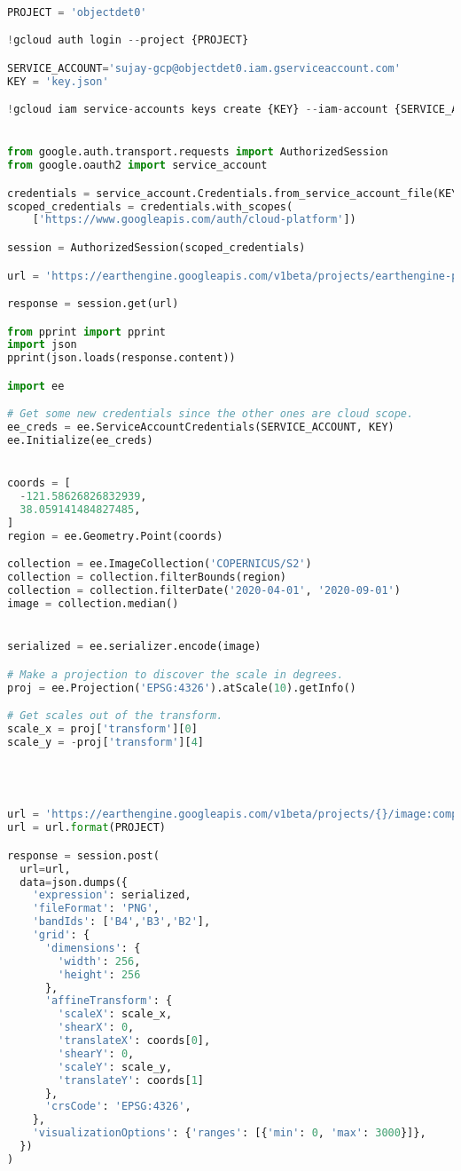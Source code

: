 \begin{lstlisting}[language=Python]

PROJECT = 'objectdet0'

!gcloud auth login --project {PROJECT}

SERVICE_ACCOUNT='sujay-gcp@objectdet0.iam.gserviceaccount.com'
KEY = 'key.json'

!gcloud iam service-accounts keys create {KEY} --iam-account {SERVICE_ACCOUNT}


from google.auth.transport.requests import AuthorizedSession
from google.oauth2 import service_account

credentials = service_account.Credentials.from_service_account_file(KEY)
scoped_credentials = credentials.with_scopes(
    ['https://www.googleapis.com/auth/cloud-platform'])

session = AuthorizedSession(scoped_credentials)

url = 'https://earthengine.googleapis.com/v1beta/projects/earthengine-public/assets/LANDSAT'

response = session.get(url)

from pprint import pprint
import json
pprint(json.loads(response.content))

import ee

# Get some new credentials since the other ones are cloud scope.
ee_creds = ee.ServiceAccountCredentials(SERVICE_ACCOUNT, KEY)
ee.Initialize(ee_creds)


coords = [
  -121.58626826832939, 
  38.059141484827485,
]
region = ee.Geometry.Point(coords)

collection = ee.ImageCollection('COPERNICUS/S2')
collection = collection.filterBounds(region)
collection = collection.filterDate('2020-04-01', '2020-09-01')
image = collection.median()


serialized = ee.serializer.encode(image)

# Make a projection to discover the scale in degrees.
proj = ee.Projection('EPSG:4326').atScale(10).getInfo()

# Get scales out of the transform.
scale_x = proj['transform'][0]
scale_y = -proj['transform'][4]




url = 'https://earthengine.googleapis.com/v1beta/projects/{}/image:computePixels'
url = url.format(PROJECT)

response = session.post(
  url=url,
  data=json.dumps({
    'expression': serialized,
    'fileFormat': 'PNG',
    'bandIds': ['B4','B3','B2'],
    'grid': {
      'dimensions': {
        'width': 256,
        'height': 256
      },
      'affineTransform': {
        'scaleX': scale_x,
        'shearX': 0,
        'translateX': coords[0],
        'shearY': 0,
        'scaleY': scale_y,
        'translateY': coords[1]
      },
      'crsCode': 'EPSG:4326',
    },
    'visualizationOptions': {'ranges': [{'min': 0, 'max': 3000}]},
  })
)


\end{lstlisting}
